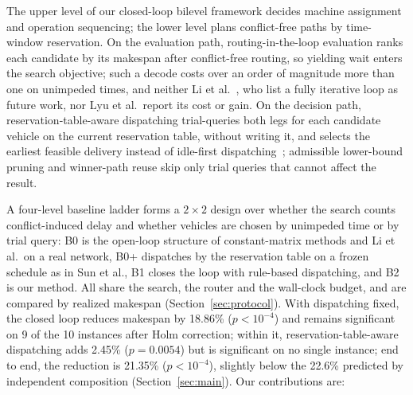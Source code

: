 \documentclass[manuscript,screen,review]{acmart}
\newcommand{\NCases}{10}
\newcommand{\GainLoopRule}{18.86\%}      %
\newcommand{\PLoopRule}{<10^{-4}}
\newcommand{\GainProbeLoop}{2.45\%}      %
\newcommand{\PProbeLoop}{=0.0054}
\newcommand{\GainEndToEnd}{21.35\%}      %
\newcommand{\PEndToEnd}{<10^{-4}}
\newcommand{\GainIndepProduct}{22.6\%}
\newcommand{\CellsSigLoopAdj}{9}
\begin{document}
The upper level of our closed-loop bilevel framework decides machine assignment and operation sequencing; the lower level plans conflict-free paths by time-window reservation.
On the evaluation path, routing-in-the-loop evaluation ranks each candidate by its makespan after conflict-free routing, so yielding wait enters the search objective; such a decode costs over an order of magnitude more than one on unimpeded times, and neither Li et al.~\cite{li2026framework}, who list a fully iterative loop as future work, nor Lyu et al.\ report its cost or gain.
On the decision path, reservation-table-aware dispatching trial-queries both legs for each candidate vehicle on the current reservation table, without writing it, and selects the earliest feasible delivery instead of idle-first dispatching~\cite{lu2022agv}; admissible lower-bound pruning and winner-path reuse skip only trial queries that cannot affect the result.

A four-level baseline ladder forms a $2\times2$ design over whether the search counts conflict-induced delay and whether vehicles are chosen by unimpeded time or by trial query: B0 is the open-loop structure of constant-matrix methods and Li et al.\ on a real network, B0+ dispatches by the reservation table on a frozen schedule as in Sun et al., B1 closes the loop with rule-based dispatching, and B2 is our method.
All share the search, the router and the wall-clock budget, and are compared by realized makespan (Section~\ref{sec:protocol}).
With dispatching fixed, the closed loop reduces makespan by \GainLoopRule{} ($p\PLoopRule$) and remains significant on \CellsSigLoopAdj{} of the \NCases{} instances after Holm correction; within it, reservation-table-aware dispatching adds \GainProbeLoop{} ($p\PProbeLoop$) but is significant on no single instance; end to end, the reduction is \GainEndToEnd{} ($p\PEndToEnd$), slightly below the \GainIndepProduct{} predicted by independent composition (Section~\ref{sec:main}).
Our contributions are:
\end{document}
